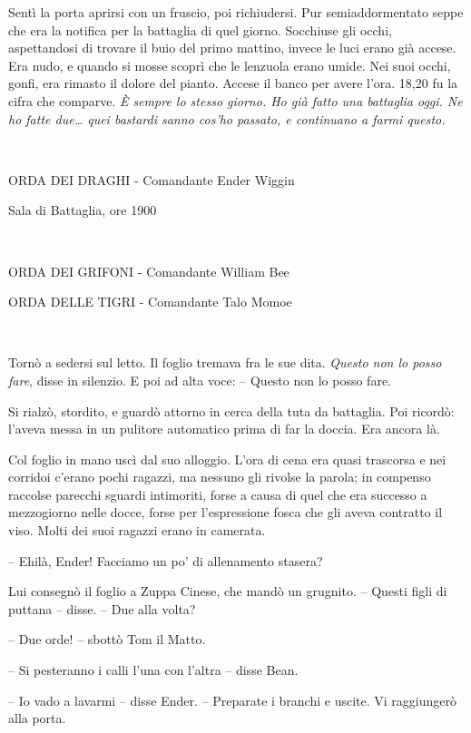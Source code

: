 {Sentì la porta aprirsi con un fruscio, poi richiudersi. Pur
	semiaddormentato seppe che era la notifica per la battaglia di quel
	giorno. Socchiuse gli occhi, aspettandosi di trovare il buio del primo
	mattino, invece le luci erano già accese. Era nudo, e quando si mosse
	scoprì che le lenzuola erano umide. Nei suoi occhi, gonfi, era rimasto
	il dolore del pianto. Accese il banco per avere l'ora. 18,20 fu la cifra
	che comparve. \emph{È sempre lo stesso giorno. Ho già fatto una
		battaglia oggi. Ne ho fatte due\ldots{} quei bastardi sanno cos'ho
		passato, e continuano a farmi questo.}}

{~}

\begin{center}
	{ORDA DEI DRAGHI - Comandante Ender Wiggin}

{Sala di Battaglia, ore 1900}

{~}

{ORDA DEI GRIFONI - Comandante William Bee}

{ORDA DELLE TIGRI - Comandante Talo Momoe}
\end{center}

{~}

{Tornò a sedersi sul letto. Il foglio tremava fra le sue dita.
	\emph{Questo non lo posso fare}, \emph{} disse in silenzio. E poi ad
	alta voce: -- Questo non lo posso fare.}

{Si rialzò, stordito, e guardò attorno in cerca della tuta da battaglia.
	Poi ricordò: l'aveva messa in un pulitore automatico prima di far la
	doccia. Era ancora là.}

{Col foglio in mano uscì dal suo alloggio. L'ora di cena era quasi
	trascorsa e nei corridoi c'erano pochi ragazzi, ma nessuno gli rivolse
	la parola; in compenso raccolse parecchi sguardi intimoriti, forse a
	causa di quel che era successo a mezzogiorno nelle docce, forse per
	l'espressione fosca che gli aveva contratto il viso. Molti dei suoi
	ragazzi erano in camerata.}

{-- Ehilà, Ender! Facciamo un po' di allenamento stasera?}

{Lui consegnò il foglio a Zuppa Cinese, che mandò un grugnito. -- Questi
	figli di puttana -- disse. -- Due alla volta?}

{-- Due orde! -- sbottò Tom il Matto.}

{-- Si pesteranno i calli l'una con l'altra -- disse Bean.}

{-- Io vado a lavarmi -- disse Ender. -- Preparate i branchi e uscite.
	Vi raggiungerò alla porta.}

